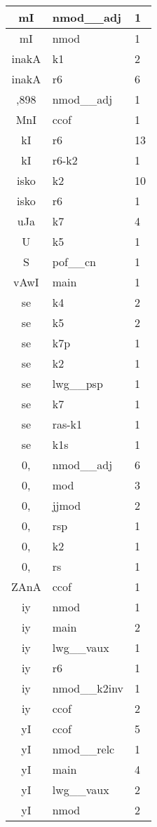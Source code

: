 \documentclass[a4 paper]{article}
\begin{document}
\begin{longtable}{cp{}p{}}
mI & nmod\_\_adj & 1\\ \midrule mI & nmod & 1\\ \midrule 
inakA & k1 & 2\\ \midrule inakA & r6 & 6\\ \midrule 
,898 & nmod\_\_adj & 1\\ \midrule 
MnI & ccof & 1\\ \midrule 
kI & r6 & 13\\ \midrule kI & r6-k2 & 1\\ \midrule 
isko & k2 & 10\\ \midrule isko & r6 & 1\\ \midrule 
uJa & k7 & 4\\ \midrule 
U & k5 & 1\\ \midrule 
S & pof\_\_cn & 1\\ \midrule 
vAwI & main & 1\\ \midrule 
se & k4 & 2\\ \midrule se & k5 & 2\\ \midrule se & k7p & 1\\ \midrule se & k2 & 1\\ \midrule se & lwg\_\_psp & 1\\ \midrule se & k7 & 1\\ \midrule se & ras-k1 & 1\\ \midrule se & k1s & 1\\ \midrule 
0, & nmod\_\_adj & 6\\ \midrule 0, & mod & 3\\ \midrule 0, & jjmod & 2\\ \midrule 0, & rsp & 1\\ \midrule 0, & k2 & 1\\ \midrule 0, & rs & 1\\ \midrule 
ZAnA & ccof & 1\\ \midrule 
iy & nmod & 1\\ \midrule iy & main & 2\\ \midrule iy & lwg\_\_vaux & 1\\ \midrule iy & r6 & 1\\ \midrule iy & nmod\_\_k2inv & 1\\ \midrule iy & ccof & 2\\ \midrule 
yI & ccof & 5\\ \midrule yI & nmod\_\_relc & 1\\ \midrule yI & main & 4\\ \midrule yI & lwg\_\_vaux & 2\\ \midrule yI & nmod & 2\\ \midrule 

\end{longtable}
\end{document}
